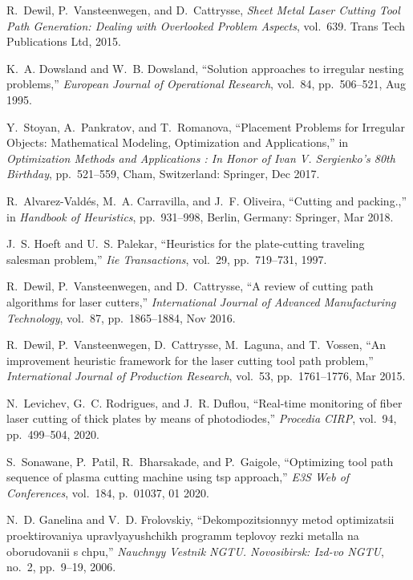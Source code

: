 \begin{thebibliography}{10}
R.~Dewil, P.~Vansteenwegen, and D.~Cattrysse, {\em {Sheet Metal Laser Cutting
  Tool Path Generation: Dealing with Overlooked Problem Aspects}}, vol.~639.
\newblock Trans Tech Publications Ltd, 2015.

K.~A. Dowsland and W.~B. Dowsland, ``{Solution approaches to irregular nesting
  problems},'' {\em European Journal of Operational Research}, vol.~84,
  pp.~506--521, Aug 1995.

Y.~Stoyan, A.~Pankratov, and T.~Romanova, ``{Placement Problems for Irregular
  Objects: Mathematical Modeling, Optimization and Applications},'' in {\em
  {Optimization Methods and Applications : In Honor of Ivan V. Sergienko's 80th
  Birthday}}, pp.~521--559, Cham, Switzerland: Springer, Dec 2017.

R.~Alvarez-Vald{\'e}s, M.~A. Carravilla, and J.~F. Oliveira, ``Cutting and
  packing.,'' in {\em {Handbook of Heuristics}}, pp.~931--998, Berlin, Germany:
  Springer, Mar 2018.

J.~S. Hoeft and U.~S. Palekar, ``Heuristics for the plate-cutting traveling
  salesman problem,'' {\em Iie Transactions}, vol.~29, pp.~719--731, 1997.

R.~Dewil, P.~Vansteenwegen, and D.~Cattrysse, ``{A review of cutting path
  algorithms for laser cutters},'' {\em International Journal of Advanced
  Manufacturing Technology}, vol.~87, pp.~1865--1884, Nov 2016.

R.~Dewil, P.~Vansteenwegen, D.~Cattrysse, M.~Laguna, and T.~Vossen, ``{An
  improvement heuristic framework for the laser cutting tool path problem},''
  {\em International Journal of Production Research}, vol.~53, pp.~1761--1776,
  Mar 2015.

N.~Levichev, G.~C. Rodrigues, and J.~R. Duflou, ``Real-time monitoring of fiber
  laser cutting of thick plates by means of photodiodes,'' {\em Procedia CIRP},
  vol.~94, pp.~499--504, 2020.

S.~Sonawane, P.~Patil, R.~Bharsakade, and P.~Gaigole, ``Optimizing tool path
  sequence of plasma cutting machine using tsp approach,'' {\em E3S Web of
  Conferences}, vol.~184, p.~01037, 01 2020.

N.~D. Ganelina and V.~D. Frolovskiy, ``Dekompozitsionnyy metod optimizatsii
  proektirovaniya upravlyayushchikh programm teplovoy rezki metalla na
  oborudovanii s chpu,'' {\em Nauchnyy Vestnik NGTU. Novosibirsk: Izd-vo NGTU},
  no.~2, pp.~9--19, 2006.


\end{thebibliography}

